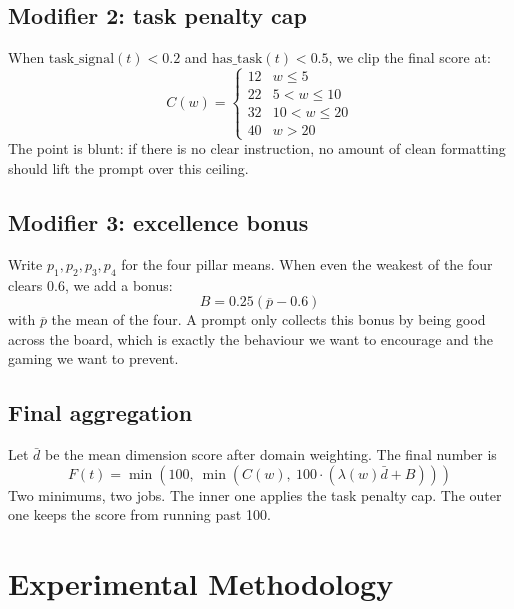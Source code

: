 \documentclass[conference]{IEEEtran}
\begin{document}
\subsection{Modifier 2: task penalty cap}
When $\mathrm{task\_signal}(t) < 0.2$ and $\mathrm{has\_task}(t) < 0.5$, we clip the final score at:
\[ C(w) = \begin{cases}
12 & w \leq 5 \\
22 & 5 < w \leq 10 \\
32 & 10 < w \leq 20 \\
40 & w > 20
\end{cases} \]
The point is blunt: if there is no clear instruction, no amount of clean formatting should lift the prompt over this ceiling.

\subsection{Modifier 3: excellence bonus}
Write $p_1, p_2, p_3, p_4$ for the four pillar means. When even the weakest of the four clears $0.6$, we add a bonus:
\[ B = 0.25 (\overline{p} - 0.6) \]
with $\overline{p}$ the mean of the four. A prompt only collects this bonus by being good across the board, which is exactly the behaviour we want to encourage and the gaming we want to prevent.

\subsection{Final aggregation}
Let $\bar{d}$ be the mean dimension score after domain weighting. The final number is
\[ F(t) = \min\!\left(100,\ \min(C(w),\ 100 \cdot (\lambda(w) \bar{d} + B))\right) \]
Two minimums, two jobs. The inner one applies the task penalty cap. The outer one keeps the score from running past 100.

\section{Experimental Methodology}
\end{document}
